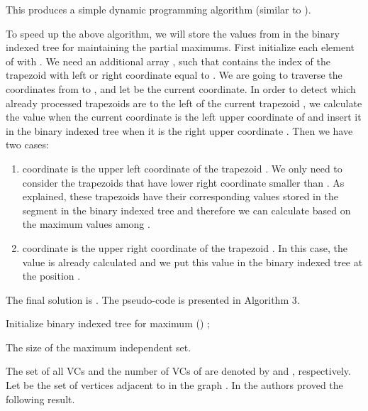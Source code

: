 \documentclass[11pt,letter]{article}
\begin{document}
This produces a simple  dynamic programming algorithm (similar to \cite{LiCh09}).



To speed up the above algorithm, we will store the values from  in the binary indexed
tree  for maintaining the partial maximums. First initialize each element of 
with . We need an additional array , such that  contains the index of the
trapezoid with left or right coordinate equal to . We are going to traverse the coordinates from
 to , and let  be the current coordinate. In order to detect which already processed
trapezoids are to the left of the current trapezoid , we calculate the value 
when the current coordinate is the left upper coordinate of  and insert it in the binary
indexed tree when it is the right upper coordinate . Then we have two cases:

\begin{enumerate}[()]
\item coordinate  is the upper left coordinate of the trapezoid .
We only need to consider the trapezoids that have lower right coordinate smaller than . As
explained, these trapezoids have their corresponding values stored in the segment  in
the binary indexed tree and therefore we can calculate  based on the maximum values
among .

\item coordinate  is the upper right coordinate of the trapezoid . In this case,
the value  is already calculated and we put this value in the binary indexed tree at
the position .
\end{enumerate}

The final solution is . The pseudo-code is presented in Algorithm 3.

\begin{algorithm}

    Initialize binary indexed tree for maximum \;
    \For{ \KwTo }
    {
        \;
        \If{}
        {
            \;
        }
        \Else(\tcp*[h]{  })
        {
            ;
        }
    }
    \Return \;

    \caption{ The size of the maximum independent set. }
\end{algorithm}


\medskip

The set of all VCs and the number of VCs of  are denoted by  and , respectively.
Let  be the set of vertices adjacent to  in the graph . In \cite{LiCh09} the authors
proved the following result.
\end{document}
